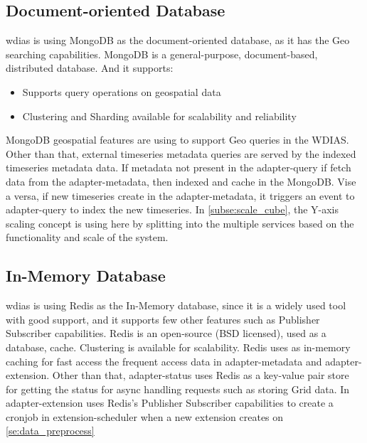 \subsection{Document-oriented Database}
\label{subse:mongodb}

\acrshort{wdias} is using  MongoDB as the document-oriented database, as it has the Geo searching capabilities.
 MongoDB \cite{mongodbMongoDBManual} is a general-purpose, document-based, distributed database. And it supports:
\begin{itemize}
  \item Supports query operations on geospatial data \cite{mongodbMongoDBManual}
  \item Clustering and Sharding available for scalability and reliability
\end{itemize}
 MongoDB geospatial features are using to support Geo queries in the WDIAS. Other than that, external timeseries metadata queries are served by the indexed timeseries metadata data.
If metadata not present in the adapter-query if fetch data from the adapter-metadata, then indexed and cache in the  MongoDB. Vise a versa, if new timeseries create in the adapter-metadata, it triggers an event to adapter-query to index the new timeseries.
In \cref{subse:scale_cube}, the Y-axis scaling concept is using here by splitting into the multiple services based on the functionality and scale of the system.

\subsection{In-Memory Database}
\label{subse:redis}
\acrshort{wdias} is using  Redis \cite{redisRedisDocumentation} as the In-Memory database, since it is a widely used tool with good support, and it supports few other features such as Publisher Subscriber capabilities.
 Redis is an open-source (BSD licensed), used as a database, cache. Clustering is available for scalability.
 Redis uses as in-memory caching for fast access the frequent access data in adapter-metadata and adapter-extension.
Other than that, adapter-status uses  Redis as a key-value pair store for getting the status for async handling requests such as storing Grid data.
In adapter-extension uses Redis's Publisher Subscriber capabilities to create a cronjob in extension-scheduler when a new extension creates on \cref{se:data_preprocess}
